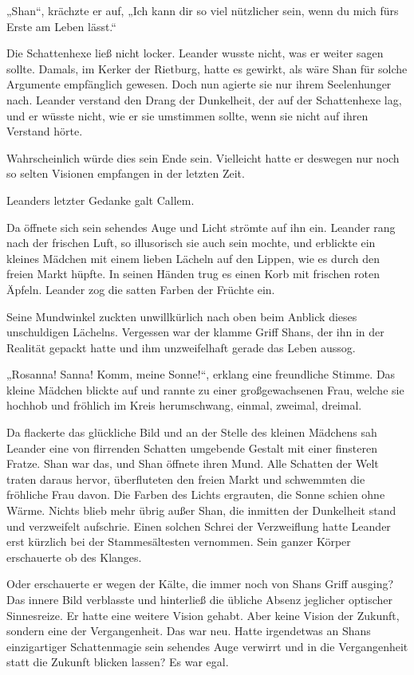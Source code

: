 „Shan“, krächzte er auf, „Ich kann dir so viel nützlicher sein, wenn du mich fürs Erste am Leben lässt.“

Die Schattenhexe ließ nicht locker. Leander wusste nicht, was er weiter sagen sollte. Damals, im Kerker der Rietburg, hatte es gewirkt, als wäre Shan für solche Argumente empfänglich gewesen. Doch nun agierte sie nur ihrem Seelenhunger nach. Leander verstand den Drang der Dunkelheit, der auf der Schattenhexe lag, und er wüsste nicht, wie er sie umstimmen sollte, wenn sie nicht auf ihren Verstand hörte.

Wahrscheinlich würde dies sein Ende sein. Vielleicht hatte er deswegen nur noch so selten Visionen empfangen in der letzten Zeit.

Leanders letzter Gedanke galt Callem.\bigskip







Da öffnete sich sein sehendes Auge und Licht strömte auf ihn ein. Leander rang nach der frischen Luft, so illusorisch sie auch sein mochte, und erblickte ein kleines Mädchen mit einem lieben Lächeln auf den Lippen, wie es durch den freien Markt hüpfte. In seinen Händen trug es einen Korb mit frischen roten Äpfeln. Leander zog die satten Farben der Früchte ein.

Seine Mundwinkel zuckten unwillkürlich nach oben beim Anblick dieses unschuldigen Lächelns. Vergessen war der klamme Griff Shans, der ihn in der Realität gepackt hatte und ihm unzweifelhaft gerade das Leben aussog.

„Rosanna! Sanna! Komm, meine Sonne!“, erklang eine freundliche Stimme. Das kleine Mädchen blickte auf und rannte zu einer großgewachsenen Frau, welche sie hochhob und fröhlich im Kreis herumschwang, einmal, zweimal, dreimal.

Da flackerte das glückliche Bild und an der Stelle des kleinen Mädchens sah Leander eine von flirrenden Schatten umgebende Gestalt mit einer finsteren Fratze. Shan war das, und Shan öffnete ihren Mund. Alle Schatten der Welt traten daraus hervor, überfluteten den freien Markt und schwemmten die fröhliche Frau davon. Die Farben des Lichts ergrauten, die Sonne schien ohne Wärme. Nichts blieb mehr übrig außer Shan, die inmitten der Dunkelheit stand und verzweifelt aufschrie. Einen solchen Schrei der Verzweiflung hatte Leander erst kürzlich bei der Stammesältesten vernommen. Sein ganzer Körper erschauerte ob des Klanges.

Oder erschauerte er wegen der Kälte, die immer noch von Shans Griff ausging? Das innere Bild verblasste und hinterließ die übliche Absenz jeglicher optischer Sinnesreize. Er hatte eine weitere Vision gehabt. Aber keine Vision der Zukunft, sondern eine der Vergangenheit. Das war neu. Hatte irgendetwas an Shans einzigartiger Schattenmagie sein sehendes Auge verwirrt und in die Vergangenheit statt die Zukunft blicken lassen? Es war egal.

